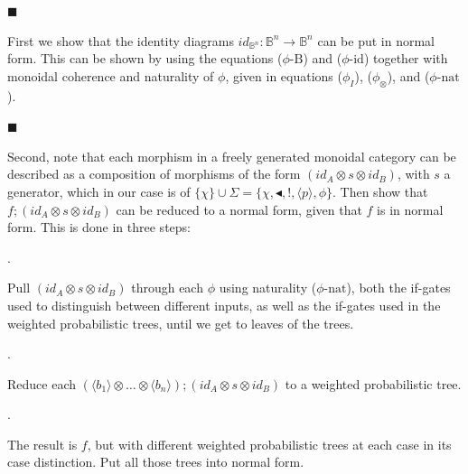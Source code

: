 \par\noindent  $\blacksquare$ 
 
First we show that the identity diagrams $\textit{id}_{\mathbb{B}^{n}}:\mathbb{B}^{n}\to\mathbb{B}^{n}$ can be put in normal form. This can be shown by using the equations ($\phi\text{-B}$) and ($\phi\text{-id}$) together with monoidal coherence and naturality of $\phi$, given in equations ($\phi_I$), ($\phi_{\otimes}$), and ($\phi\text{-nat}$).\par
 
 
 
\par\noindent  $\blacksquare$ 
 
Second, note that each morphism in a freely generated monoidal category can be described as a composition of morphisms of the form $(\textit{id}_{A}\otimes s\otimes\textit{id}_{B})$, with $s$ a generator, which in our case is of $\{\chi\}\cup\Sigma=\{\chi,\blacktriangleleft,!,\langle p\rangle,\phi\}$. Then show that $f;(\textit{id}_{A}\otimes s\otimes\textit{id}_{B})$ can be reduced to a normal form, given that $f$ is in normal form. This is done in three steps:\par
  
\par{}. 
 
Pull $(\textit{id}_{A}\otimes s\otimes\textit{id}_{B})$ through each $\phi$ using naturality ($\phi\text{-nat}$), both the if-gates used to distinguish between different inputs, as well as the if-gates used in the weighted probabilistic trees, until we get to leaves of the trees.\par
 
 
 
\par{}. 
 
Reduce each $(\langle b_{1}\rangle\otimes\dots\otimes\langle b_{n}\rangle);(\textit{id}_{A}\otimes s\otimes\textit{id}_{B})$ to a weighted probabilistic tree.\par
 
 
 
\par{}. 
 
The result is $f$, but with different weighted probabilistic trees at each case in its case distinction. Put all those trees into normal form.\par
 
